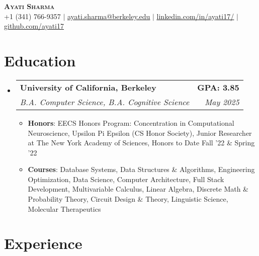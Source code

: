\documentclass[letterpaper,11pt]{article}
\makeatletter
\newcommand{\resumeItemBF}[2]{
  \item\small{
    \textbf{#1}{: #2 \vspace{-4pt}}
  }
}
\newcommand{\resumeSubheading}[4]{
  \vspace{-2pt}\item
    \begin{tabular*}{0.97\textwidth}[t]{l@{\extracolsep{\fill}}r}
      \textbf{#1} & #2 \\
      \textit{\small#3} & \textit{\small #4} \\
    \end{tabular*}\vspace{-8pt}
}
\newcommand{\resumeSubHeadingListStart}{\begin{itemize}[leftmargin=0.05in, label={}]}
\newcommand{\resumeSubHeadingListEnd}{\end{itemize}}
\newcommand{\resumeItemListStart}{\begin{itemize}[leftmargin=0.2in]}
\newcommand{\resumeItemListEnd}{\end{itemize}\vspace{-5pt}}
\makeatother
\begin{document}
\begin{center}
    \textbf{\Huge \scshape Ayati Sharma} \\ \vspace{1pt}
    \small +1 (341) 766-9357 $|$ \href{mailto:ayati.sharma@berkeley.edu}{\underline{ayati.sharma@berkeley.edu}} $|$
    \href{https://www.linkedin.com/in/ayati17/}{\underline{linkedin.com/in/ayati17/}} $|$
    \href{https://github.com/ayati17/}{\underline{github.com/ayati17}}
    

\end{center}
\vspace{-15pt}


\section{Education}

\resumeSubHeadingListStart
    \resumeSubheading
        {University of California, Berkeley}{\textbf{GPA: 3.85}}
        {B.A. Computer Science, B.A. Cognitive Science}{May 2025}
        
        
        \resumeItemListStart
            \resumeItemBF{Honors}{EECS Honors Program: Concentration in Computational Neuroscience, Upsilon Pi Epsilon (CS Honor Society), Junior Researcher at The New York Academy of Sciences, Honors to Date Fall '22 \&  Spring '22}
            \resumeItemBF{Courses}{Database Systems, Data Structures \& Algorithms, Engineering Optimization, Data Science, Computer Architecture, Full Stack Development,  Multivariable Calculus, Linear Algebra, Discrete Math \& Probability Theory, Circuit Design \& Theory, Linguistic Science, Molecular Therapeutics}
            
        \resumeItemListEnd
\resumeSubHeadingListEnd


\section{Experience}
\end{document}
